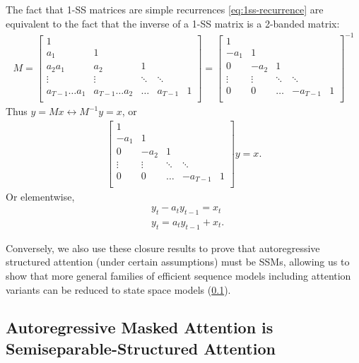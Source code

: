 \begin{remark}
  The fact that 1-SS matrices are simple recurrences \eqref{eq:1ss-recurrence} are equivalent to the fact that the inverse of a 1-SS matrix is a 2-banded matrix:
\begin{align*}
  M =
  \begin{bmatrix}
    1 & \\
    a_1 & 1 & \\
    a_2a_1 & a_2 & 1 \\
    \vdots & \vdots & \ddots & \ddots \\
    a_{T-1}\dots a_1 & a_{T-1}\dots a_2 & \dots & a_{T-1} & 1 \\
  \end{bmatrix}
  =
  \begin{bmatrix}
    1 & \\
    -a_1 & 1 & \\
    0 & -a_2 & 1 \\
    \vdots & \vdots & \ddots & \ddots \\
    0 & 0 & \dots & -a_{T-1} & 1 \\
  \end{bmatrix}^{-1}
\end{align*}
Thus $y = Mx \leftrightarrow M^{-1}y = x$, or
\begin{align*}
  \begin{bmatrix}
    1 & \\
    -a_1 & 1 & \\
    0 & -a_2 & 1 \\
    \vdots & \vdots & \ddots & \ddots \\
    0 & 0 & \dots & -a_{T-1} & 1 \\
  \end{bmatrix}
  y = x
  .
\end{align*}
Or elementwise,
\begin{align*}
  & y_t - a_t y_{t-1} = x_t \\
  & y_t = a_t y_{t-1} + x_t
  .
\end{align*}
\end{remark}
Conversely,
we also use these closure results to prove that autoregressive structured attention (under certain assumptions)
must be SSMs,
allowing us to show that more general families of efficient sequence models including attention variants can be reduced to state space models (\cref{sec:theory-details:ssm-sma}).




\subsection{Autoregressive Masked Attention is Semiseparable-Structured Attention}
\label{sec:theory-details:ssm-sma}

